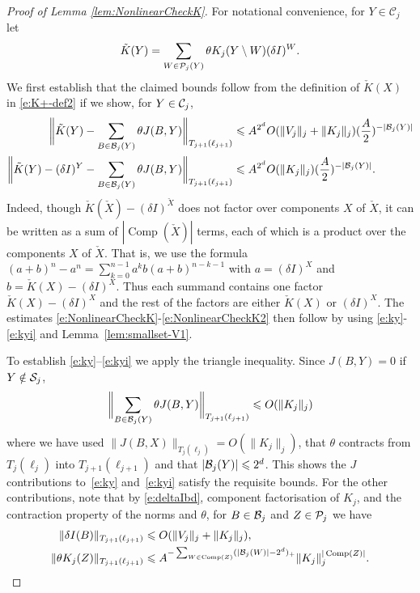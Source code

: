 \documentclass[11pt]{amsart}
\numberwithin{equation}{section}
\numberwithin{theorem}{section}
\newcommand{\1}{{\bf 1}}
\newcommand{\Comp}{\operatorname{Comp}}
\begin{document}
\begin{proof}[Proof of Lemma \ref{lem:NonlinearCheckK}]
  For notational convenience, for $Y\in \mathcal C_j$ let
  \begin{equation}
    \tilde K(Y)= \sum_{W \in \mathcal P_j(Y)} \theta K_j(Y\setminus W) (\delta I)^W.
  \end{equation}
  We first establish that the claimed bounds follow from the definition of $\check{K}(X)$ in \eqref{e:K+-def2} if we show, for $Y\in \mathcal C_j$,
  \begin{align}
    \label{e:ky}
    \biggl\lVert \tilde K(Y)-\sum_{B \in \mathcal B_j(Y)} {\theta} J(B,Y) \biggr\rVert_{T_{j+1}(\ell_{j+1})}
    &\leqslant A^{2^d}
    O (\|V_j\|_j + \|K_j\|_j)
      (\frac{A}{2})^{-|\mathcal B_j(Y)|}
    \\ \label{e:kyi}
    \biggl\lVert \tilde K(Y)-(\delta I)^Y-\sum_{B \in \mathcal B_j(Y)} {\theta} J(B,Y) \biggr\rVert_{T_{j+1}(\ell_{j+1})}
    &\leqslant A^{2^d}
    O (\|K_j\|_j)
      (\frac{A}{2})^{-|\mathcal B_j(Y)|}.
  \end{align}
  Indeed, though $\check{K}(\check{X}) - (\delta I)^{\check{X}}$ does
  not factor over components $X$ of $\check{X}$, it can be written as a
  sum of $|\Comp(\check{X})|$ terms, each of which is a product over
  the components $X$ of $\check{X}$. That is, we use the
    formula $(a+b)^{n}-a^{n}=\sum_{k=0}^{n-1}a^{k}b(a+b)^{n-k-1}$ with
    $a=(\delta I)^{X}$ and $b=\check{K}(X)-(\delta I)^{X}$. Thus each
    summand
  contains one factor $\check{K}(X)-(\delta I)^{X}$ and the rest of
  the factors are either $\check{K}(X)$ or $(\delta
    I)^{X}$. The estimates
  \eqref{e:NonlinearCheckK}-\eqref{e:NonlinearCheckK2} then follow by
  using \eqref{e:ky}-\eqref{e:kyi} and
  Lemma~\ref{lem:smallset-V1}.
  
  To establish \eqref{e:ky}--\eqref{e:kyi} we apply the triangle inequality. Since $J(B,Y)=0$ if $Y\notin \mathcal S_{j}$, 
  \begin{equation}
    \label{eq:Jterm}
    \biggl\lVert \sum_{B \in \mathcal B_j(Y)}\theta  J(B,Y)
     \biggr\rVert_{T_{j+1}(\ell_{j+1})} \leqslant O(\|K_{j}\|_{j}) 
  \end{equation}
  where we have used
  $\|J(B, X)\|_{T_{j}(\ell_{j})}=O(\|K_j\|_{j})$,
  that $\theta$ contracts from $T_j(\ell_j)$ into $T_{j+1}(\ell_{j+1})$
  and that $|\mathcal B_j(Y)|\leqslant 2^d$. This shows the $J$
  contributions to~\eqref{e:ky} and~\eqref{e:kyi} satisfy the
  requisite bounds. For the other contributions, note that
  by \eqref{e:deltaIbd}, component factorisation of $K_j$,
  and the contraction property of the norms and $\theta$,
  for $B\in \mathcal B_j$ and $Z\in \mathcal P_j$ we have
  \begin{align}
    \|\delta I(B)\|_{T_{j+1}(\ell_{j+1})}
    &\leq O(\|V_j\|_j+\|K_j\|_j), \\
    \|\theta K_j(Z)\|_{T_{j+1}(\ell_{j+1})} &\leq A^{-\sum_{W\in
        \Comp(Z)} (|\cB_j(W)|-2^d)_+}\|K_j\|_j^{|\Comp(Z)|}. 
  \end{align}


\end{proof}
\end{document}
